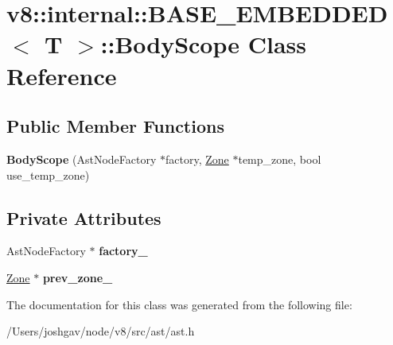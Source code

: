 \hypertarget{classv8_1_1internal_1_1_b_a_s_e___e_m_b_e_d_d_e_d_1_1_body_scope}{}\section{v8\+:\+:internal\+:\+:B\+A\+S\+E\+\_\+\+E\+M\+B\+E\+D\+D\+ED$<$ T $>$\+:\+:Body\+Scope Class Reference}
\label{classv8_1_1internal_1_1_b_a_s_e___e_m_b_e_d_d_e_d_1_1_body_scope}
\subsection*{Public Member Functions}
\begin{DoxyCompactItemize}
\item 
{\bfseries Body\+Scope} (Ast\+Node\+Factory $\ast$factory, \hyperlink{classv8_1_1internal_1_1_zone}{Zone} $\ast$temp\+\_\+zone, bool use\+\_\+temp\+\_\+zone)\hypertarget{classv8_1_1internal_1_1_b_a_s_e___e_m_b_e_d_d_e_d_1_1_body_scope_a36e307b352804ec23f27214f7440b1e2}{}\label{classv8_1_1internal_1_1_b_a_s_e___e_m_b_e_d_d_e_d_1_1_body_scope_a36e307b352804ec23f27214f7440b1e2}

\end{DoxyCompactItemize}
\subsection*{Private Attributes}
\begin{DoxyCompactItemize}
\item 
Ast\+Node\+Factory $\ast$ {\bfseries factory\+\_\+}\hypertarget{classv8_1_1internal_1_1_b_a_s_e___e_m_b_e_d_d_e_d_1_1_body_scope_ad8334bbb9880b4371787e6ce14b01138}{}\label{classv8_1_1internal_1_1_b_a_s_e___e_m_b_e_d_d_e_d_1_1_body_scope_ad8334bbb9880b4371787e6ce14b01138}

\item 
\hyperlink{classv8_1_1internal_1_1_zone}{Zone} $\ast$ {\bfseries prev\+\_\+zone\+\_\+}\hypertarget{classv8_1_1internal_1_1_b_a_s_e___e_m_b_e_d_d_e_d_1_1_body_scope_a5bd348dbca73a538c71c626b8af55cdf}{}\label{classv8_1_1internal_1_1_b_a_s_e___e_m_b_e_d_d_e_d_1_1_body_scope_a5bd348dbca73a538c71c626b8af55cdf}

\end{DoxyCompactItemize}


The documentation for this class was generated from the following file\+:\begin{DoxyCompactItemize}
\item 
/\+Users/joshgav/node/v8/src/ast/ast.\+h\end{DoxyCompactItemize}
